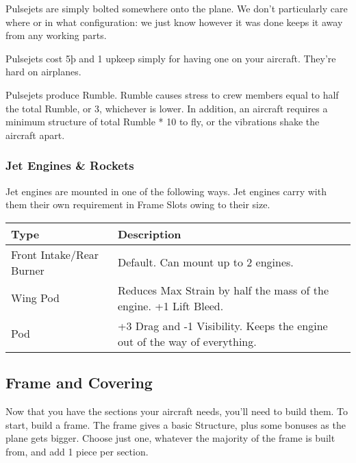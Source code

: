 \documentclass{article}
\begin{document}
Pulsejets are simply bolted somewhere onto the plane. We don't
particularly care where or in what configuration: we just know however
it was done keeps it away from any working parts.

Pulsejets cost 5þ and 1 upkeep simply for having one on your aircraft.
They're hard on airplanes.

Pulsejets produce Rumble. Rumble causes stress to crew members equal to
half the total Rumble, or 3, whichever is lower. In addition, an aircraft requires a
minimum structure of total Rumble * 10 to fly, or the vibrations shake
the aircraft apart.

\subsubsection{Jet Engines \& Rockets}
\label{_Jet_Engines_\&_Rockets}

Jet engines are mounted in one of the following ways. Jet engines carry
with them their own requirement in Frame Slots owing to their size.

\begin{tabular}{|l|l|}
    \hline
    Type                     & Description                                                   \\\hline
    Front Intake/Rear Burner & Default. Can mount up to 2 engines.                           \\\hline
    Wing Pod                 & Reduces Max Strain by half the mass of the engine. +1 Lift
    Bleed.                                                                                   \\\hline
    Pod                      & +3 Drag and -1 Visibility. Keeps the engine out of the way of
    everything.                                                                              \\\hline
\end{tabular}

\subsection{Frame and Covering}
\label{_Frame_and_Covering}

Now that you have the sections your aircraft needs, you'll need to build
them. To start, build a frame. The frame gives a basic Structure, plus
some bonuses as the plane gets bigger. Choose just one, whatever the
majority of the frame is built from, and add 1 piece per section.
\end{document}
